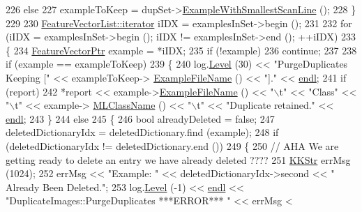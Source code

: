 \begin{DoxyCode}
226       \textcolor{keywordflow}{else}
227         exampleToKeep = dupSet->\hyperlink{class_k_k_m_l_l_1_1_duplicate_image_aa2ee78da71de8a85c0a1b576f8e76a09}{ExampleWithSmallestScanLine} ();
228     \}
229     
230     \hyperlink{class_k_k_b_1_1_k_k_queue_aa3c2796a726eea468b94132a9fbf2cfe}{FeatureVectorList::iterator} iIDX = examplesInSet->begin ();
231 
232     \textcolor{keywordflow}{for}  (iIDX = examplesInSet->begin ();  iIDX != examplesInSet->end ();  ++iIDX)
233     \{
234       \hyperlink{class_k_k_m_l_l_1_1_feature_vector}{FeatureVectorPtr} example = *iIDX;
235       \textcolor{keywordflow}{if}  (!example)
236         \textcolor{keywordflow}{continue};
237 
238       \textcolor{keywordflow}{if}  (example == exampleToKeep)
239       \{
240         log.\hyperlink{class_k_k_b_1_1_run_log_a32cf761d7f2e747465fd80533fdbb659}{Level} (30) << \textcolor{stringliteral}{"PurgeDuplicates  Keeping ["} << exampleToKeep->
      \hyperlink{class_k_k_m_l_l_1_1_feature_vector_ab47c89ab1e9396664fdc0dc34b6e1ab5}{ExampleFileName} () << \textcolor{stringliteral}{"]."} << \hyperlink{namespace_k_k_b_ad1f50f65af6adc8fa9e6f62d007818a8}{endl};
241         \textcolor{keywordflow}{if}  (report)
242           *report << example->\hyperlink{class_k_k_m_l_l_1_1_feature_vector_ab47c89ab1e9396664fdc0dc34b6e1ab5}{ExampleFileName} () << \textcolor{stringliteral}{"\(\backslash\)t"} << \textcolor{stringliteral}{"Class"} << \textcolor{stringliteral}{"\(\backslash\)t"} << example->
      \hyperlink{class_k_k_m_l_l_1_1_feature_vector_a2f4e2e9d2f0a727a2ff2b2f859828b61}{MLClassName} () << \textcolor{stringliteral}{"\(\backslash\)t"} << \textcolor{stringliteral}{"Duplicate retained."} << \hyperlink{namespace_k_k_b_ad1f50f65af6adc8fa9e6f62d007818a8}{endl};
243       \}
244       \textcolor{keywordflow}{else}
245       \{
246         \textcolor{keywordtype}{bool}  alreadyDeleted = \textcolor{keyword}{false};
247         deletedDictionaryIdx = deletedDictionary.find (example);
248         \textcolor{keywordflow}{if}  (deletedDictionaryIdx != deletedDictionary.end ())
249         \{
250           \textcolor{comment}{// AHA We are getting ready to delete an entry we have already deleted ????}
251           \hyperlink{class_k_k_b_1_1_k_k_str}{KKStr}  errMsg (1024);
252           errMsg << \textcolor{stringliteral}{"Example: "} << deletedDictionaryIdx->second << \textcolor{stringliteral}{"  Already Been Deleted."};
253           log.\hyperlink{class_k_k_b_1_1_run_log_a32cf761d7f2e747465fd80533fdbb659}{Level} (-1) << \hyperlink{namespace_k_k_b_ad1f50f65af6adc8fa9e6f62d007818a8}{endl} << \textcolor{stringliteral}{"DuplicateImages::PurgeDuplicates   ***ERROR***  "} << errMsg <

\end{DoxyCode}
